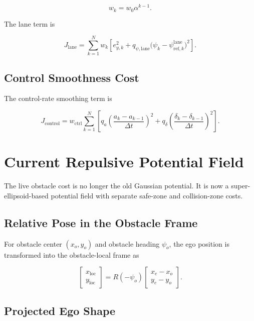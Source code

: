 \documentclass[11pt]{article}
\begin{document}
\begin{equation}
w_k = w_0 \alpha^{k-1}.
\end{equation}

The lane term is

\begin{equation}
J_{\mathrm{lane}}
=
\sum_{k=1}^{N}
w_k
\left[
e_{y,k}^2
+
q_{\psi,\mathrm{lane}}
\big(\psi_k-\psi^{\mathrm{lane}}_{\mathrm{ref},k}\big)^2
\right].
\end{equation}

\subsection{Control Smoothness Cost}

The control-rate smoothing term is

\begin{equation}
J_{\mathrm{control}}
=
w_{\mathrm{ctrl}}
\sum_{k=1}^{N}
\left[
q_a\left(\frac{a_k-a_{k-1}}{\Delta t}\right)^2
+
q_{\delta}\left(\frac{\delta_k-\delta_{k-1}}{\Delta t}\right)^2
\right].
\end{equation}

\section{Current Repulsive Potential Field}

The live obstacle cost is no longer the old Gaussian potential. It is now a
super-ellipsoid-based potential field with separate safe-zone and collision-zone
costs.

\subsection{Relative Pose in the Obstacle Frame}

For obstacle center $(x_o,y_o)$ and obstacle heading $\psi_o$, the ego position
is transformed into the obstacle-local frame as

\begin{equation}
\begin{bmatrix}
x_{\mathrm{loc}} \\
y_{\mathrm{loc}}
\end{bmatrix}
=
R(-\psi_o)
\begin{bmatrix}
x_e-x_o \\
y_e-y_o
\end{bmatrix}.
\end{equation}

\subsection{Projected Ego Shape}
\end{document}
